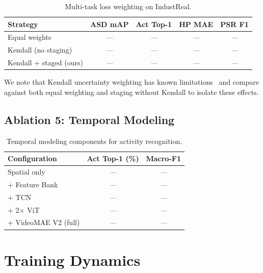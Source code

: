 \documentclass[10pt,journal,compsoc]{IEEEtran}
\newcommand{\todo}{\textit{---}}
\newcommand{\popwres}{\todo}
\begin{document}
\begin{table}[htbp]
\centering
\small
\caption{Multi-task loss weighting on IndustReal.}
\label{tab:abl-mtl}
\begin{tabular}{l c c c c}
\toprule
\textbf{Strategy} & \textbf{ASD mAP} & \textbf{Act Top-1} & \textbf{HP MAE} & \textbf{PSR F1} \\
\midrule
Equal weights & \popwres & \popwres & \popwres & \popwres \\
Kendall (no staging) & \popwres & \popwres & \popwres & \popwres \\
Kendall + staged (ours) & \popwres & \popwres & \popwres & \popwres \\
\bottomrule
\end{tabular}
\end{table}

We note that Kendall uncertainty weighting has known limitations~\cite{kirchdorfer2025uw} and compare against both equal weighting and staging without Kendall to isolate these effects.

\subsection{Ablation 5: Temporal Modeling}

\begin{table}[htbp]
\centering
\small
\caption{Temporal modeling components for activity recognition.}
\label{tab:abl-temporal}
\begin{tabular}{l c c}
\toprule
\textbf{Configuration} & \textbf{Act Top-1 (\%)} & \textbf{Macro-F1} \\
\midrule
Spatial only & \popwres & \popwres \\
+ Feature Bank & \popwres & \popwres \\
+ TCN & \popwres & \popwres \\
+ 2$\times$ ViT & \popwres & \popwres \\
+ VideoMAE V2 (full) & \popwres & \popwres \\
\bottomrule
\end{tabular}
\end{table}

\FloatBarrier

\section{Training Dynamics}
\label{sec:training-dynamics}
\end{document}
